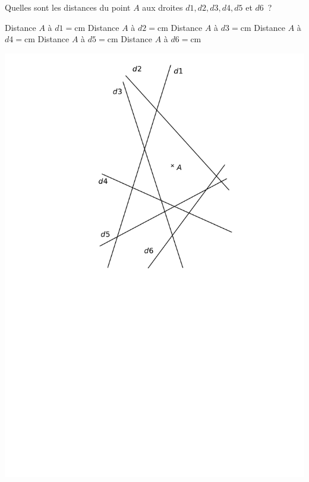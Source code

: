 \documentclass[a4paper,11pt]{report}
\begin{document}
\begin{exop}
{
Quelles sont les distances du point $A$ aux droites $d1, d2, d3, d4, d5$ et $d6$~? 

\begin{minipage}[t]{0.47\textwidth}{
\vspace{0pt}
\begin{tasks}
    \task Distance $A$ à $d1=$cm
    \task Distance $A$ à $d2=$cm
    \task Distance $A$ à $d3=$cm
    \task Distance $A$ à $d4=$cm
    \task Distance $A$ à $d5=$cm
    \task Distance $A$ à $d6=$cm
\end{tasks}
}
\end{minipage}
\begin{minipage}[t]{0.53\textwidth}{
\vspace{0pt}
\begin{center}
\includegraphics[scale=0.8]{media/es-11/13-15}
\end{center}	
}

\end{minipage}}
\end{exop}
\end{document}
